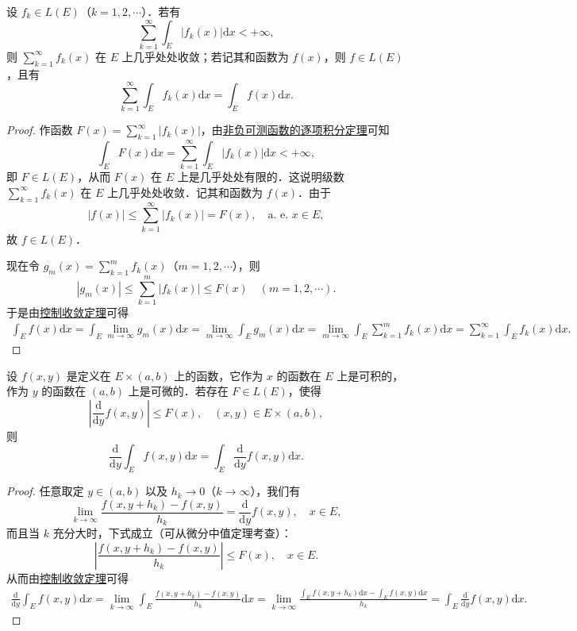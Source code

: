\documentclass[../../main.tex]{subfiles}%
\begin{document}
\begin{corollary}[逐项积分定理]\label{corollary:逐项积分定理}
设 \( f_k \in L(E) \)（\( k = 1,2,\cdots \)）．若有
\[
\sum_{k=1}^{\infty} \int_E |f_k(x)| \mathrm{d}x < +\infty,
\]
则 \( \sum_{k=1}^{\infty} f_k(x) \) 在 \( E \) 上几乎处处收敛；若记其和函数为 \( f(x) \)，则 \( f \in L(E) \)，且有
\[
\sum_{k=1}^{\infty} \int_E f_k(x) \mathrm{d}x = \int_E f(x) \mathrm{d}x. 
\]
\end{corollary}
\begin{proof}
作函数 \( F(x) = \sum_{k=1}^{\infty} |f_k(x)| \)，由\hyperref[theorem:非负可测函数的逐项积分定理]{非负可测函数的逐项积分定理}可知
\[
\int_E F(x) \mathrm{d}x = \sum_{k=1}^{\infty} \int_E |f_k(x)| \mathrm{d}x < +\infty,
\]
即 \( F \in L(E) \)，从而 \( F(x) \) 在 \( E \) 上是几乎处处有限的．这说明级数 \( \sum_{k=1}^{\infty} f_k(x) \) 在 \( E \) 上几乎处处收敛．记其和函数为 \( f(x) \)．由于
\[
|f(x)| \leqslant \sum_{k=1}^{\infty} |f_k(x)| = F(x), \quad \text{a. e. } x \in E,
\]
故 \( f \in L(E) \)．

现在令 \( g_m(x) = \sum_{k=1}^{m} f_k(x) \)（\( m = 1,2,\cdots \)），则
\[
|g_m(x)| \leqslant \sum_{k=1}^{m} |f_k(x)| \leqslant F(x) \quad (m = 1,2,\cdots).
\]
于是由\hyperref[theorem:控制收敛定理]{控制收敛定理}可得
\begin{align*}
\int_E{f(x)\mathrm{d}x}=\int_E{\lim_{m\rightarrow \infty} g_m(x)\mathrm{d}x}=\lim_{m\rightarrow \infty} \int_E{g_m(x)\mathrm{d}x}=\underset{m\rightarrow \infty}{\lim}\int_E{\sum_{k=1}^m{f_k\left( x \right)}\mathrm{d}x}=\sum_{k=1}^{\infty}{\int_E{f_k(x)\mathrm{d}x}}.
\end{align*}
\end{proof}

\begin{theorem}[积分求导定理]\label{theorem:积分求导定理}
设 \( f(x,y) \) 是定义在 \( E \times (a,b) \) 上的函数，它作为 \( x \) 的函数在 \( E \) 上是可积的，作为 \( y \) 的函数在 \( (a,b) \) 上是可微的．若存在 \( F \in L(E) \)，使得
\[
\left| \frac{\mathrm{d}}{\mathrm{d}y} f(x,y) \right| \leqslant F(x), \quad (x,y) \in E \times (a,b),
\]
则
\[
\frac{\mathrm{d}}{\mathrm{d}y} \int_E f(x,y) \mathrm{d}x = \int_E \frac{\mathrm{d}}{\mathrm{d}y} f(x,y) \mathrm{d}x. 
\]
\end{theorem}
\begin{proof}
任意取定 \( y \in (a,b) \) 以及 \( h_k \to 0 \)（\( k \to \infty \)），我们有
\[
\lim_{k \to \infty} \frac{f(x,y + h_k) - f(x,y)}{h_k} = \frac{\mathrm{d}}{\mathrm{d}y} f(x,y), \quad x \in E,
\]
而且当 \( k \) 充分大时，下式成立（可从微分中值定理考查）：
\[
\left| \frac{f(x,y + h_k) - f(x,y)}{h_k} \right| \leqslant F(x), \quad x \in E.
\]
从而由\hyperref[theorem:控制收敛定理]{控制收敛定理}可得
\begin{align*}
\frac{\mathrm{d}}{\mathrm{d}y}\int_E{f(x,y)\mathrm{d}x}=\lim_{k\rightarrow \infty} \int_E{\frac{f(x,y+h_k)-f(x,y)}{h_k}\mathrm{d}x}=\lim_{k\rightarrow \infty} \frac{\int_E{f\left( x,y+h_k \right) \mathrm{d}x}-\int_E{f\left( x,y \right) \mathrm{d}x}}{h_k}=\int_E{\frac{\mathrm{d}}{\mathrm{d}y}f(x,y)\mathrm{d}x}.
\end{align*}
\end{proof}
\end{document}
